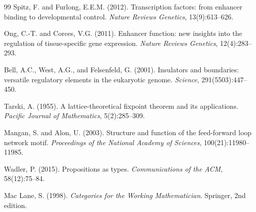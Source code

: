 \documentclass[12pt,a4paper]{article}
\begin{document}
\begin{thebibliography}{99}
Spitz, F. and Furlong, E.E.M. (2012).
Transcription factors: from enhancer binding to developmental control.
\textit{Nature Reviews Genetics}, 13(9):613--626.

Ong, C.-T. and Corces, V.G. (2011).
Enhancer function: new insights into the regulation of tissue-specific gene expression.
\textit{Nature Reviews Genetics}, 12(4):283--293.

Bell, A.C., West, A.G., and Felsenfeld, G. (2001).
Insulators and boundaries: versatile regulatory elements in the eukaryotic genome.
\textit{Science}, 291(5503):447--450.

Tarski, A. (1955).
A lattice-theoretical fixpoint theorem and its applications.
\textit{Pacific Journal of Mathematics}, 5(2):285--309.

Mangan, S. and Alon, U. (2003).
Structure and function of the feed-forward loop network motif.
\textit{Proceedings of the National Academy of Sciences}, 100(21):11980--11985.

Wadler, P. (2015).
Propositions as types.
\textit{Communications of the ACM}, 58(12):75--84.

Mac Lane, S. (1998).
\textit{Categories for the Working Mathematician}.
Springer, 2nd edition.

\end{thebibliography}
\end{document}
